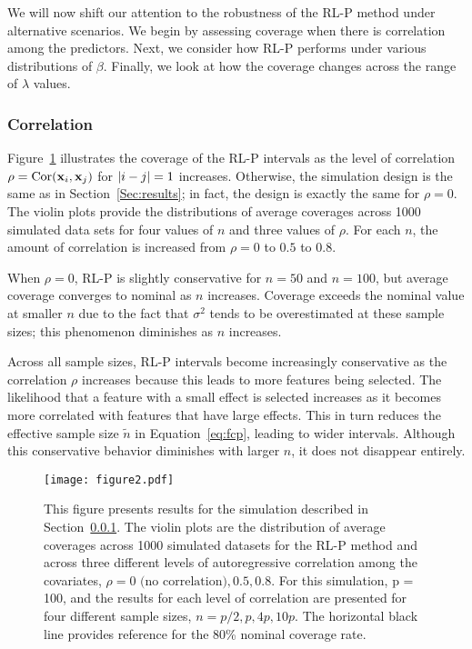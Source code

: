 We will now shift our attention to the robustness of the RL-P method under alternative scenarios. We begin by assessing coverage when there is correlation among the predictors. Next, we consider how RL-P performs under various distributions of $\beta$. Finally, we look at how the coverage changes across the range of $\lambda$ values.

\subsubsection{Correlation}
\label{Sec:correlation}

Figure~\ref{fig:2} illustrates the coverage of the RL-P intervals as the level of correlation $\rho = \textrm{Cor}(\mathbf{x}_i, \mathbf{x}_j)$ for $\left\lvert i-j\right\rvert = 1$ increases. Otherwise, the simulation design is the same as in Section~\ref{Sec:results}; in fact, the design is exactly the same for $\rho = 0$. The violin plots provide the distributions of average coverages across 1000 simulated data sets for four values of $n$ and three values of $\rho$. For each $n$, the amount of correlation is increased from $\rho = 0$ to $0.5$ to $0.8$.

When $\rho = 0$, RL-P is slightly conservative for $n = 50$ and $n = 100$, but average coverage converges to nominal as $n$ increases. Coverage exceeds the nominal value at smaller $n$ due to the fact that $\sigma^2$ tends to be overestimated at these sample sizes; this phenomenon diminishes as $n$ increases.

Across all sample sizes, RL-P intervals become increasingly conservative as the correlation $\rho$ increases because this leads to more features being selected. The likelihood that a feature with a small effect is selected increases as it becomes more correlated with features that have large effects. This in turn reduces the effective sample size $\tilde{n}$ in Equation~\ref{eq:fcp}, leading to wider intervals. Although this conservative behavior diminishes with larger $n$, it does not disappear entirely.

\begin{figure}[htb!]
  \begin{center}
    \texttt{[image: figure2.pdf]}
    \caption{\label{fig:2} This figure presents results for the simulation described in Section~\ref{Sec:correlation}. The violin plots are the distribution of average coverages across 1000 simulated datasets for the RL-P method and across three different levels of autoregressive correlation among the covariates, $\rho = 0 \text{ (no correlation)}, 0.5, 0.8$. For this simulation, p = 100, and the results for each level of correlation are presented for four different sample sizes, $n = p/2, p, 4p, 10p$. The horizontal black line provides reference for the 80\% nominal coverage rate.}
  \end{center}
\end{figure}


